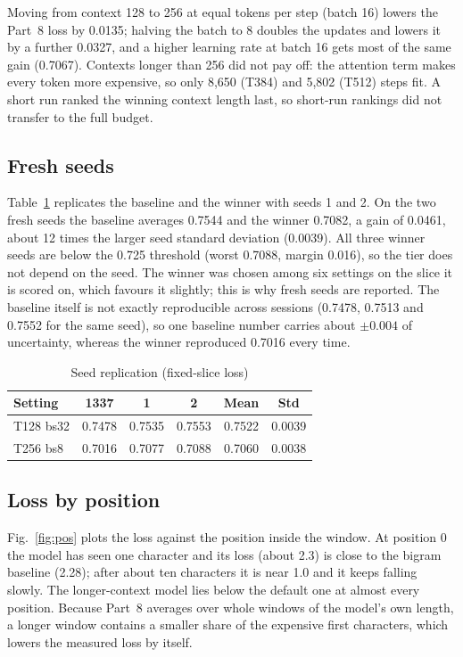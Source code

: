 \documentclass[10pt,twocolumn]{article}
\begin{document}
Moving from context 128 to 256 at equal tokens per step (batch 16) lowers the Part~8 loss by 0.0135; halving the batch to 8 doubles the updates and lowers it by a further 0.0327, and a higher learning rate at batch 16 gets most of the same gain (0.7067). Contexts longer than 256 did not pay off: the attention term makes every token more expensive, so only 8,650 (T384) and 5,802 (T512) steps fit. A short run ranked the winning context length last, so short-run rankings did not transfer to the full budget.

\subsection{Fresh seeds}
Table~\ref{tab:seed} replicates the baseline and the winner with seeds 1 and 2. On the two fresh seeds the baseline averages 0.7544 and the winner 0.7082, a gain of 0.0461, about 12 times the larger seed standard deviation (0.0039). All three winner seeds are below the 0.725 threshold (worst 0.7088, margin 0.016), so the tier does not depend on the seed. The winner was chosen among six settings on the slice it is scored on, which favours it slightly; this is why fresh seeds are reported. The baseline itself is not exactly reproducible across sessions (0.7478, 0.7513 and 0.7552 for the same seed), so one baseline number carries about $\pm0.004$ of uncertainty, whereas the winner reproduced 0.7016 every time.

\begin{table}[t]\centering\caption{Seed replication (fixed-slice loss)}\label{tab:seed}
\footnotesize\begin{tabular}{lccccc}\toprule
Setting & 1337 & 1 & 2 & Mean & Std\\\midrule
T128 bs32 & 0.7478 & 0.7535 & 0.7553 & 0.7522 & 0.0039\\
T256 bs8 & 0.7016 & 0.7077 & 0.7088 & 0.7060 & 0.0038\\\bottomrule\end{tabular}\end{table}

\subsection{Loss by position}
Fig.~\ref{fig:pos} plots the loss against the position inside the window. At position 0 the model has seen one character and its loss (about 2.3) is close to the bigram baseline (2.28); after about ten characters it is near 1.0 and it keeps falling slowly. The longer-context model lies below the default one at almost every position. Because Part~8 averages over whole windows of the model's own length, a longer window contains a smaller share of the expensive first characters, which lowers the measured loss by itself.
\end{document}
